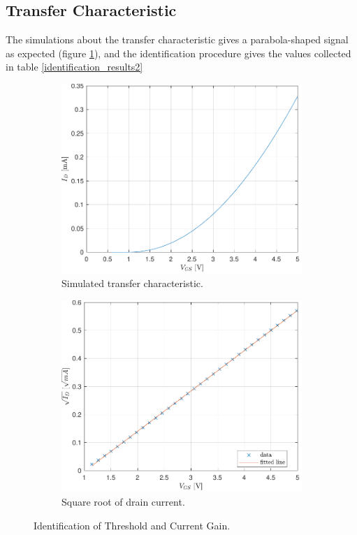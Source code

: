 \documentclass[11pt,a4paper]{article}
\begin{document}
	\subsection{Transfer Characteristic}
	The simulations about the transfer characteristic gives a parabola-shaped signal as expected (figure \ref*{parabola2}), and the identification procedure gives the values collected in table \ref*{identification_results2}
		\begin{figure}
			\centering
			\begin{subfigure}[b]{0.45\textwidth}
				\centering
				\includegraphics[width=\textwidth]{parabola2}
				\caption{Simulated transfer characteristic.}
				\label{parabola2}
			\end{subfigure}
			\hfill
			\begin{subfigure}[b]{0.45\textwidth}
				\centering
				\includegraphics[width=\textwidth]{sqrt_fit2}
				\caption{Square root of drain current.}
				\label{sqrt_fit2}
			\end{subfigure}
			\caption{Identification of Threshold and Current Gain.}
			\label{identification2}
		\end{figure}
\end{document}
